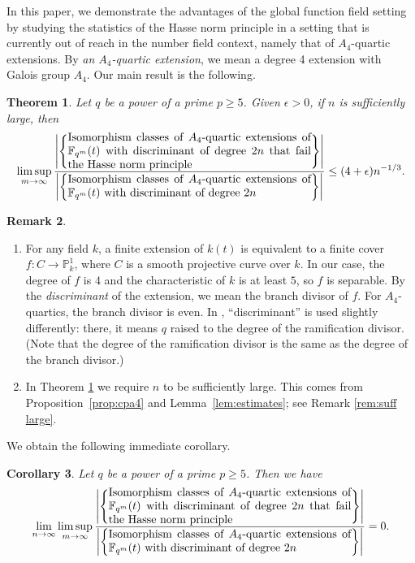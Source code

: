\documentclass{amsart}
\numberwithin{equation}{section} \numberwithin{figure}{section}
\newcommand\PP{\mathbb{P}}
\theoremstyle{one}
\newtheorem{theorem}{\textbf{Theorem}}[section]
\newtheorem{corollary}[theorem]{\textbf{Corollary}}
\theoremstyle{definition}
\newtheorem{remark}[theorem]{Remark}
\begin{document}
In this paper, we demonstrate the advantages of the global function field setting by studying the statistics of the Hasse norm principle in a setting that is currently out of reach in the number field context, namely that of $A_4$-quartic extensions.
By \emph{an \(A_4\)-quartic extension}, we mean a degree 4 extension with Galois group $A_4$. Our main result is the following. 

  \begin{theorem}\label{thm: main result}
    Let \(q\) be a power of a prime \(p \geq 5\).
    Given \(\epsilon > 0\), if \(n\) is sufficiently large, then
    \[  \limsup_{m \to \infty} \frac{\left|\left\{\parbox{.62\textwidth}{Isomorphism classes of \(A_4\)-quartic extensions of \(\mathbb{F}_{q^m}(t)\) with discriminant of degree \(2n\) that fail the Hasse norm principle}\right\}\right|}{\left|\left\{\parbox{.62\textwidth}{Isomorphism classes of \(A_4\)-quartic extensions of \(\mathbb{F}_{q^m}(t)\) with discriminant of degree \(2n\)}\right\}\right|} \leq (4+\epsilon) n^{-1/3}.\]
  \end{theorem}
  \begin{remark}
    \begin{enumerate}
    \item 
    For any field \(k\), a finite extension of \(k(t)\) is equivalent to a finite cover \(f \colon C \to \PP^1_k\), where \(C\) is a smooth projective curve over \(k\).
      In our case, the degree of \(f\) is \(4\) and the characteristic of \(k\) is at least \(5\), so \(f\) is separable.
      By the \emph{discriminant} of the extension, we mean the branch divisor of \(f\).
      For \(A_4\)-quartics, the branch divisor is even.
      In \cite{ell.ven:05}, ``discriminant'' is used slightly differently: there, it means \(q\) raised to the degree of the ramification divisor. (Note that the degree of the ramification divisor is the same as the degree of the branch divisor.)
            
    \item
    In Theorem \ref{thm: main result} we require $n$ to be sufficiently large. This comes from
    Proposition~\ref{prop:cpa4} and Lemma~\ref{lem:estimates}; see Remark \ref{rem:suff large}.
    \end{enumerate}
  \end{remark}
  

We obtain the following immediate corollary.
\begin{corollary}\label{Cor: main result}
Let $q$ be a power of a prime $p\geq5$.
     Then we have
    \[ \lim_{n \to \infty} \limsup_{m \to \infty} \frac{\left|\left\{\parbox{.62\textwidth}{Isomorphism classes of \(A_4\)-quartic extensions of \(\mathbb{F}_{q^m}(t)\) with discriminant of degree \(2n\) that fail the Hasse norm principle}\right\}\right|}{\left|\left\{\parbox{.62\textwidth}{Isomorphism classes of \(A_4\)-quartic extensions of \(\mathbb{F}_{q^m}(t)\) with discriminant of degree \(2n\)}\right\}\right|}  = 0.\]
\end{corollary}
\end{document}
